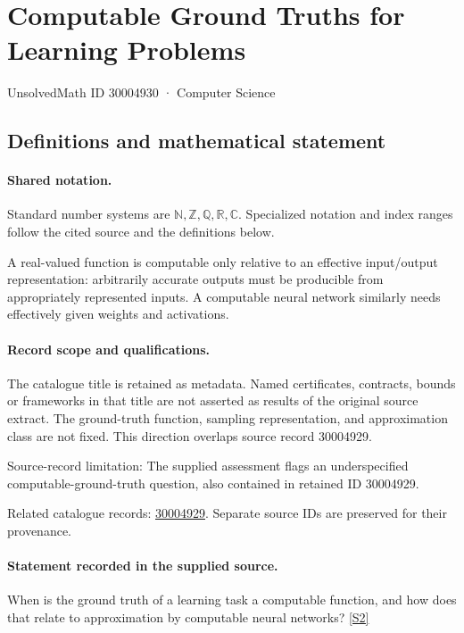 \documentclass[11pt]{article}
\newcommand{\sref}[2]{\hyperlink{source:#1:#2}{[S#2]}}
\begin{document}
\setcounter{section}{30004929}
\section{Computable Ground Truths for Learning Problems}\label{30004930}
{\small\sffamily UnsolvedMath ID 30004930 · Computer Science}
\subsection{Definitions and mathematical statement}

\paragraph{Shared notation.}Standard number systems are $\mathbb N,\mathbb Z,\mathbb Q,\mathbb R,\mathbb C$. Specialized notation and index ranges follow the cited source and the definitions below.


A real-valued function is computable only relative to an effective input/output representation: arbitrarily accurate outputs must be producible from appropriately represented inputs. A computable neural network similarly needs effectively given weights and activations.
\paragraph{Record scope and qualifications.}
The catalogue title is retained as metadata. Named certificates, contracts, bounds or frameworks in that title are not asserted as results of the original source extract.
The ground-truth function, sampling representation, and approximation class are not fixed. This direction overlaps source record 30004929.

Source-record limitation: The supplied assessment flags an underspecified computable-ground-truth question, also contained in retained ID 30004929.

Related catalogue records: \href{https://mehmetmars7.github.io/Erdosproblems-llm-hunter/problem.html?type=open_problems&id=30004929}{30004929}. Separate source IDs are preserved for their provenance.
\paragraph{Statement recorded in the supplied source.}
When is the ground truth of a learning task a computable function, and how does that relate to approximation by computable neural networks? \sref{30004930}{2}
\end{document}
